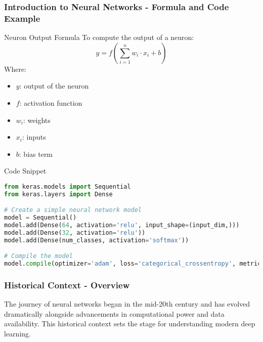 \documentclass{beamer}
\begin{document}
\begin{frame}[fragile]
    \frametitle{Introduction to Neural Networks - Formula and Code Example}
    \begin{block}{Neuron Output Formula}
        To compute the output of a neuron:
        \begin{equation}
            y = f\left(\sum_{i=1}^{n} w_i \cdot x_i + b\right)
        \end{equation}
        Where:
        \begin{itemize}
            \item $y$: output of the neuron
            \item $f$: activation function
            \item $w_i$: weights
            \item $x_i$: inputs
            \item $b$: bias term
        \end{itemize}
    \end{block}
    \begin{block}{Code Snippet}
        \begin{lstlisting}[language=Python]
from keras.models import Sequential
from keras.layers import Dense

# Create a simple neural network model
model = Sequential()
model.add(Dense(64, activation='relu', input_shape=(input_dim,)))
model.add(Dense(32, activation='relu'))
model.add(Dense(num_classes, activation='softmax'))

# Compile the model
model.compile(optimizer='adam', loss='categorical_crossentropy', metrics=['accuracy'])
        \end{lstlisting}
    \end{block}
\end{frame}

\begin{frame}[fragile]
    \frametitle{Historical Context - Overview}
    The journey of neural networks began in the mid-20th century and has evolved dramatically alongside advancements in computational power and data availability. This historical context sets the stage for understanding modern deep learning.
\end{frame}
\end{document}
